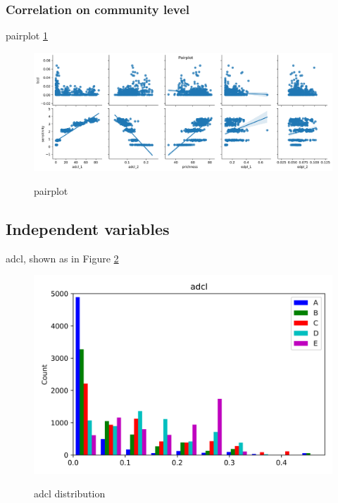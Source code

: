\documentclass{article}
\begin{document}
\subsubsection{Correlation on community level}
pairplot \ref{pairplot-communitylevel}
\begin{figure}[htbp]
	\centering
	\includegraphics[width=\textwidth, keepaspectratio]{pairplot-community.png}\\
	\caption{pairplot}
	\label{pairplot-communitylevel}
\end{figure}

\subsection{Independent variables}

adcl, shown as in Figure \ref{adcl}
\begin{figure}[htbp]
	\centering
	\includegraphics[width=\textwidth, keepaspectratio]{adcl.png}\\
	\caption{adcl distribution}
	\label{adcl}
\end{figure}
\end{document}
